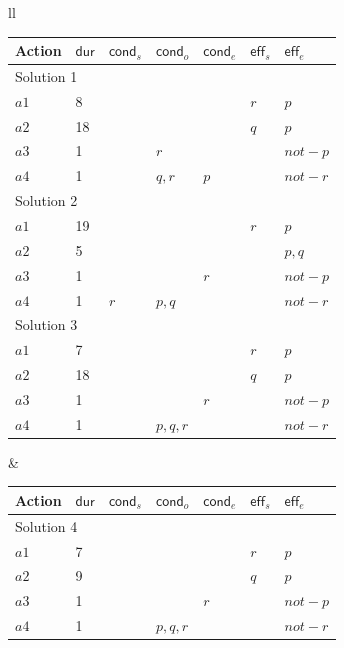 \documentclass[runningheads]{llncs}
\newcommand{\eff}{\mathsf{eff}}    %
\newcommand{\cond}{\mathsf{cond}}  %
\newcommand{\dur}{\mathsf{dur}}    %
\begin{document}
\begin{figure}
\footnotesize
\begin{tabular}{ll}
\hspace{-0.6cm}\begin{tabular}{lllllll}
Action & $\dur$ & $\cond_s$ & $\cond_o$ & $\cond_e$ & $\eff_s$ & $\eff_e$ \\

\hline

\multicolumn{7}{l}{Solution 1} \\
$a1$ & 8 & & & & $r$ & $p$ \\
$a2$ & 18 & & & & $q$ & $p$ \\
$a3$ & 1 & & $r$ & & & $not-p$ \\
$a4$ & 1 & & $q,r$ & $p$ & & $not-r$ \\

\hline

\multicolumn{7}{l}{Solution 2} \\
$a1$ & 19 & & & & $r$ & $p$ \\
$a2$ & 5 & & & & & $p,q$ \\
$a3$ & 1 & & & $r$ & & $not-p$ \\
$a4$ & 1 & $r$ & $p,q$ & & & $not-r$ \\

\hline

\multicolumn{7}{l}{Solution 3} \\
$a1$ & 7 & & & & $r$ & $p$ \\
$a2$ & 18 & & & & $q$ & $p$ \\
$a3$ & 1 & & & $r$  & & $not-p$ \\
$a4$ & 1 & & $p,q,r$ & & & $not-r$ \\
\end{tabular} &

\hspace{0.3cm}\begin{tabular}{lllllll}

Action & $\dur$ & $\cond_s$ & $\cond_o$ & $\cond_e$ & $\eff_s$ & $\eff_e$ \\

\hline

\multicolumn{7}{l}{Solution 4} \\
$a1$ & 7 & & & & $r$ & $p$ \\
$a2$ & 9 & & & & $q$ & $p$ \\
$a3$ & 1 & & & $r$ & & $not-p$ \\
$a4$ & 1 & & $p,q,r$ & & & $not-r$ \\


\end{tabular}
\end{tabular}
\end{figure}
\end{document}
